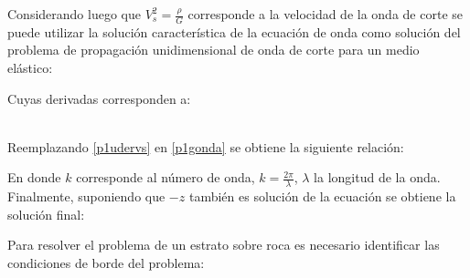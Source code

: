 Considerando luego que $V_s^2=\frac{\rho}{G}$ corresponde a la velocidad de la onda de corte se puede utilizar la solución característica de la ecuación de onda como solución del problema de propagación unidimensional de onda de corte para un medio elástico:


Cuyas derivadas corresponden a:

\\

Reemplazando \eqref{p1udervs} en \eqref{p1gonda} se obtiene la siguiente relación:


En donde $k$ corresponde al número de onda, $k = \frac{2\pi}{\lambda}$, $\lambda$ la longitud de la onda. Finalmente, suponiendo que $-z$ también es solución de la ecuación se obtiene la solución final:


Para resolver el problema de un estrato sobre roca es necesario identificar las condiciones de borde del problema:

